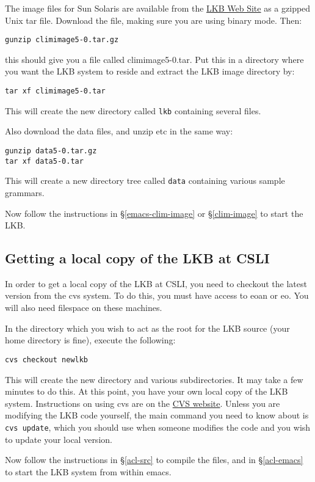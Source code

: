 \documentclass[12pt]{report}
\begin{document}
The image files for Sun Solaris are available from the
\href{http://www-csli.stanford.edu/~aac/lkb.html}{LKB Web Site}
as a gzipped Unix tar file.
Download the file, making sure you are using binary mode.
Then:
\begin{verbatim}
gunzip climimage5-0.tar.gz
\end{verbatim}
this should give you a file called climimage5-0.tar.
Put this in a directory where you want the LKB system to reside
and extract the LKB image directory by:
\begin{verbatim}
tar xf climimage5-0.tar
\end{verbatim}
This will create the new directory called {\tt lkb} containing
several files. 

Also download the data files, and unzip etc in the same way:
\begin{verbatim}
gunzip data5-0.tar.gz
tar xf data5-0.tar
\end{verbatim}
This will create a new directory tree called {\tt data} containing
various sample grammars.

Now follow the instructions in \S\ref{emacs-clim-image}
or \S\ref{clim-image}
to start the LKB.

\subsection{Getting a local copy of the LKB at CSLI}
\label{down-csli}

In order to get a local copy of the LKB at CSLI, you need to
checkout the latest version from the cvs system.  To do this,
you must have access to eoan or eo.  You will also need filespace
on these machines.

In the directory which you wish to act as the root for the LKB source
(your home directory is fine), execute the following:
\begin{verbatim}
cvs checkout newlkb
\end{verbatim}
This will create the new directory and various subdirectories.
It may take a few minutes to do this.  At this point, you have 
your own local copy of the LKB system.  Instructions on using
cvs are on the
\href{http://www.loria.fr/~molli/cvs/doc/cvs_toc.html}{CVS website}. 
Unless you are modifying the LKB
code yourself, the main command you need
to know about is \verb+cvs update+, which you should use
when someone modifies the code and you wish to update your local version.

Now follow the instructions in \S\ref{acl-src} to compile the
files, and in \S\ref{acl-emacs} to start the LKB system from within
emacs.
\end{document}
